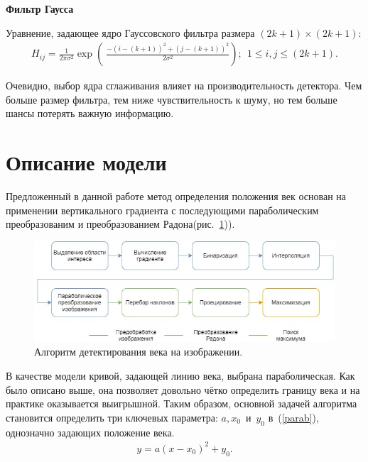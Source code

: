 \documentclass[12pt,a4paper]{article} %
\begin{document}
\textbf{Фильтр Гаусса}

Уравнение, задающее ядро Гауссовского фильтра размера $(2k+1)\times (2k+1)$:
\begin{gather}\label{norm}
	H_{ij}=\frac{1}{2\pi \sigma^2}\exp{\left(\ \frac {-(i-(k+1))^2+(j-(k+1))^2}{2\sigma^2}\right)};~~1\leq i, j \leq(2k+1).
\end{gather}

Очевидно, выбор ядра сглаживания влияет на производительность детектора. Чем больше размер фильтра, тем ниже чувствительность к шуму, но тем больше шансы потерять важную информацию.

\newpage




\newpage
\section{Описание модели}

 Предложенный в данной работе метод определения положения век основан на применении вертикального градиента с последующими параболическим преобразованим и преобразованием Радона(рис.~\ref{fig:map})).

\begin{figure}[h]
	
	\centering
	
	\includegraphics[width=0.8\linewidth]{map.jpg}
	
	\caption{Алгоритм детектирования века на изображении.}
	
	\label{fig:map}
	
\end{figure}

В качестве модели кривой, задающей линию века, выбрана параболическая. Как было описано выше, она позволяет довольно чётко определить границу века и на практике оказывается выигрышной. Таким образом, основной задачей алгоритма становится определить три ключевых параметра: $a, x_0$~и~$y_0$ в~(\ref{parab}), однозначно задающих положение века.
\begin{gather}\label{parab}
	y = a(x-x_0)^2 + y_0.
\end{gather}
\end{document}
